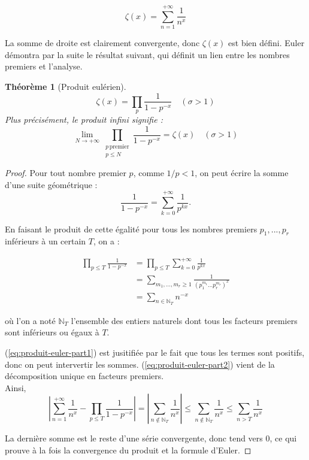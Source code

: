 \documentclass[french]{report}
\newtheorem{theorem}{Théorème}[section]
\begin{document}
\[ \zeta(x) = \sum_{n=1}^{+\infty}\frac{1}{n^x} \]

La somme de droite est clairement convergente, donc $\zeta(x)$ est bien défini. Euler démontra par la suite le résultat suivant, qui définit un lien entre les nombres premiers et l'analyse.

\begin{theorem}[Produit eulérien]\label{thm:produit-eulerien-reel}
  \[ \zeta(x) = \prod_p\frac{1}{1-p^{-x}}\quad(\sigma>1) \]
  Plus précisément, le produit infini signifie :
  \[ \lim_{N\to+\infty}\prod_{\substack{p\,\mathrm{premier}\\p\leq N}}\frac{1}{1-p^{-x}}=\zeta(x)\quad(\sigma>1) \]
\end{theorem}

\begin{proof}
  Pour tout nombre premier $p$, comme $1/p<1$, on peut écrire la somme d'une suite géométrique :
  \[ \frac{1}{1-p^{-x}}=\sum_{k=0}^{+\infty}\frac{1}{p^{kx}}. \]

  En faisant le produit de cette égalité pour tous les nombres premiers $p_1, ..., p_r$ inférieurs à un certain $T$, on a :
  
  \begin{align}
    \prod_{p\leq T}\frac{1}{1-p^{-x}}
    &= \prod_{p\leq T}\sum_{k=0}^{+\infty}\frac{1}{p^{kx}}  \\
    &= \sum_{m_1,...,m_r\geq1}\frac{1}{(p_1^{m_1}...p_r^{m_r})^x} \label{eq:produit-euler-part1} \\
    &= \sum_{n\in\mathbb{N}_T}n^{-x} \label{eq:produit-euler-part2}
  \end{align}

  où l'on a noté $\mathbb{N}_T$ l'ensemble des entiers naturels dont tous les facteurs premiers sont inférieurs ou égaux à $T$.

  (\ref{eq:produit-euler-part1}) est jusitifiée par le fait que tous les termes sont positifs, donc on peut intervertir les sommes. (\ref{eq:produit-euler-part2}) vient de la décomposition unique en facteurs premiers.
  \\

  Ainsi,
  \[ \left|\sum_{n=1}^{+\infty}\frac{1}{n^x}-\prod_{p\leq T}\frac{1}{1-p^{-x}}\right|
  = \left|\sum_{n\notin\mathbb{N}_T}\frac{1}{n^x}\right|
  \leq \sum_{n\notin\mathbb{N}_T}\frac{1}{n^x}
  \leq \sum_{n>T}\frac{1}{n^x}
  \]

  La dernière somme est le reste d'une série convergente, donc tend vers 0, ce qui prouve à la fois la convergence du produit et la formule d'Euler.
\end{proof}
\end{document}
